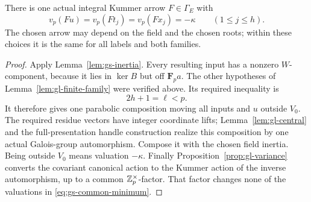 \begin{theorem}
\label{thm:gs-one-arrow}
There is one actual integral Kummer arrow $F\in\Gamma_E$ with
\begin{equation}\label{eq:gs-common-minimum}
 v_p(Fu)=v_p(Ft_j)=v_p(Fx_j)=-\kappa
                  \qquad(1\le j\le h).
\end{equation}
The chosen arrow may depend on the field and the chosen roots;
within these choices it is the same for all labels and both families.
\end{theorem}
\begin{proof}
Apply Lemma~\ref{lem:gs-inertia}. Every resulting input has a
nonzero $W$-component, because it lies in $\ker B$ but off
$\mathbf F_pa$. The other hypotheses of
Lemma~\ref{lem:gl-finite-family} were verified above. Its required
inequality is
\[
                       2h+1=\ell<p.
\]
It therefore gives one parabolic composition moving all inputs
and $u$ outside $V_0$. The required residue vectors have integer
coordinate lifts; Lemma~\ref{lem:gl-central} and the full-presentation
handle construction realize this composition by one actual
Galois-group automorphism. Compose it with the chosen field inertia.
Being outside $V_0$ means valuation $-\kappa$.
Finally Proposition~\ref{prop:gl-variance} converts the covariant
canonical action to the Kummer action of the inverse automorphism,
up to a common $\mathbb Z_p^\times$-factor. That factor changes none of
the valuations in \eqref{eq:gs-common-minimum}.
\end{proof}

